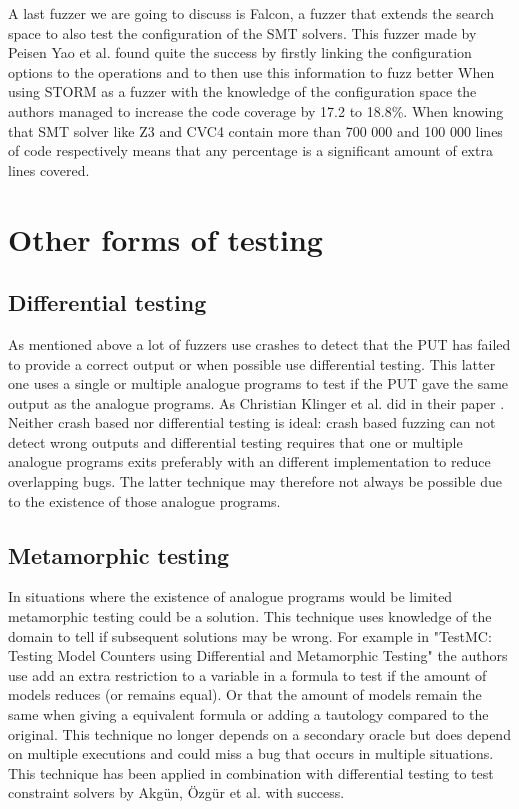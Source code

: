 A last fuzzer we are going to discuss is Falcon, a fuzzer that extends the search space to also test the configuration of the SMT solvers. This fuzzer made by Peisen Yao et al. \cite{42FalconFuzzingConfigurationSettingsAndNormal} found quite the success by firstly linking the configuration options to the operations and to then use this information to fuzz better
When using STORM as a fuzzer with the knowledge of the configuration space the authors managed to increase the code coverage by 17.2 to 18.8\%. When knowing that SMT solver like Z3 and CVC4 contain more than 700 000 and 100 000 lines of code respectively means that any percentage is a significant amount of extra lines covered.

\section{Other forms of testing}
\subsection{Differential testing}
\label{fuzzing:DifferentialTesting}
As mentioned above a lot of fuzzers use crashes to detect that the PUT has failed to provide a correct output or when possible use differential testing. This latter one uses a single or multiple analogue programs to test if the PUT gave the same output as the analogue programs. As Christian Klinger et al. did in their paper \cite{48klinger2019differentially}. Neither crash based nor differential testing is ideal: crash based fuzzing can not detect wrong outputs and differential testing requires that one or multiple analogue programs exits preferably with an different implementation to reduce overlapping bugs. The latter technique may therefore not always be possible due to the existence of those analogue programs.

\subsection{Metamorphic testing}
\label{fuzzing:MetamorphicTesting}
In situations where the existence of analogue programs would be limited metamorphic testing could be a solution. This technique uses knowledge of the domain to tell if subsequent solutions may be wrong. For example in "TestMC: Testing Model Counters using Differential and Metamorphic Testing" \cite{49usman2020testmc} the authors use add an extra restriction to a variable in a formula to test if the amount of models reduces (or remains equal). Or that the amount of models remain the same when giving a equivalent formula or adding a tautology compared to the original. This technique no longer depends on a secondary oracle but does depend on multiple executions and could miss a bug that occurs in multiple situations. This technique has been applied in combination with differential testing to test constraint solvers \cite{50akgun2018metamorphic} by Akg{\"u}n, {\"O}zg{\"u}r et al. with success. 


